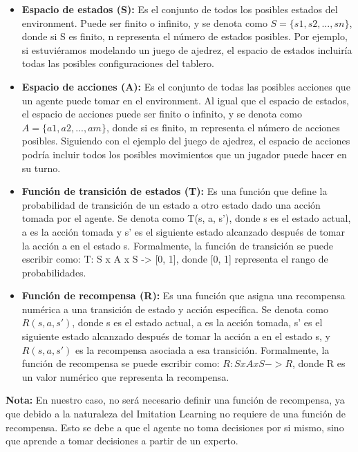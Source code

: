 \begin{itemize}
    \item \textbf{Espacio de estados (S):} Es el conjunto de todos los posibles estados del environment. 
    Puede ser finito o infinito, y se denota como $S = \{s1, s2, ..., sn\}$, donde si S es finito, n representa 
    el número de estados posibles. Por ejemplo, si estuviéramos modelando un juego de ajedrez, el espacio 
    de estados incluiría todas las posibles configuraciones del tablero.

    \item \textbf{Espacio de acciones (A):} Es el conjunto de todas las posibles acciones que un agente 
    puede tomar en el environment. Al igual que el espacio de estados, el espacio de acciones puede ser finito 
    o infinito, y se denota como $A = \{a1, a2, ..., am\}$, donde si es finito, m representa el número de 
    acciones posibles. Siguiendo con el ejemplo del juego de ajedrez, el espacio de acciones podría incluir 
    todos los posibles movimientos que un jugador puede hacer en su turno.

    \item \textbf{Función de transición de estados (T):} Es una función que define la probabilidad de transición 
    de un estado a otro estado dado una acción tomada por el agente. Se denota como T(s, a, s'), donde s es el 
    estado actual, a es la acción tomada y s' es el siguiente estado alcanzado después de tomar la acción a en 
    el estado s. Formalmente, la función de transición se puede escribir como: T: S x A x S -> [0, 1], donde 
    [0, 1] representa el rango de probabilidades.

    \item \textbf{Función de recompensa (R):} Es una función que asigna una recompensa numérica a una transición 
    de estado y acción específica. Se denota como $R(s, a, s')$, donde s es el estado actual, a es la acción tomada, 
    s' es el siguiente estado alcanzado después de tomar la acción a en el estado s, y $R(s, a, s')$ es 
    la recompensa asociada a esa transición. Formalmente, la función de recompensa se puede escribir 
    como: $R: S x A x S -> R$, donde R es un valor numérico que representa la recompensa. 
\end{itemize}

\textbf{Nota: } En nuestro caso, no será necesario definir una función de recompensa, ya que debido a la 
naturaleza del Imitation Learning no requiere de una función de recompensa. Esto se debe a que el agente 
no toma decisiones por si mismo, sino que aprende a tomar decisiones a partir de un experto.

